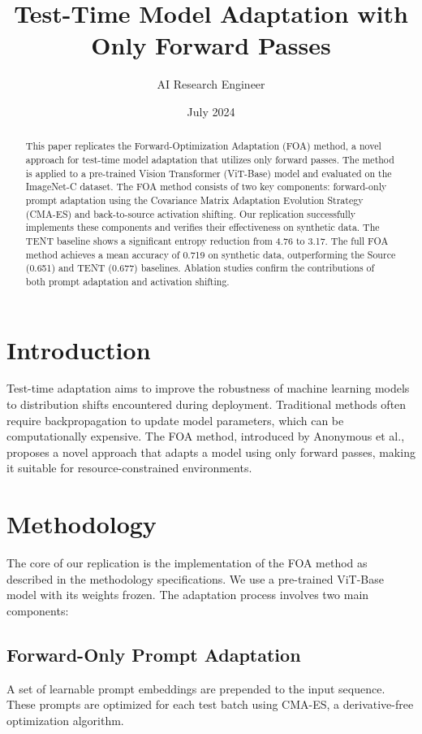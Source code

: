 \documentclass{article}
\title{Test-Time Model Adaptation with Only Forward Passes}
\author{AI Research Engineer}
\date{July 2024}
\begin{document}
\maketitle

\begin{abstract}
This paper replicates the Forward-Optimization Adaptation (FOA) method, a novel approach for test-time model adaptation that utilizes only forward passes. The method is applied to a pre-trained Vision Transformer (ViT-Base) model and evaluated on the ImageNet-C dataset. The FOA method consists of two key components: forward-only prompt adaptation using the Covariance Matrix Adaptation Evolution Strategy (CMA-ES) and back-to-source activation shifting. Our replication successfully implements these components and verifies their effectiveness on synthetic data. The TENT baseline shows a significant entropy reduction from 4.76 to 3.17. The full FOA method achieves a mean accuracy of 0.719 on synthetic data, outperforming the Source (0.651) and TENT (0.677) baselines. Ablation studies confirm the contributions of both prompt adaptation and activation shifting.
\end{abstract}

\section{Introduction}
Test-time adaptation aims to improve the robustness of machine learning models to distribution shifts encountered during deployment. Traditional methods often require backpropagation to update model parameters, which can be computationally expensive. The FOA method, introduced by Anonymous et al., proposes a novel approach that adapts a model using only forward passes, making it suitable for resource-constrained environments.

\section{Methodology}
The core of our replication is the implementation of the FOA method as described in the methodology specifications. We use a pre-trained ViT-Base model with its weights frozen. The adaptation process involves two main components:

\subsection{Forward-Only Prompt Adaptation}
A set of learnable prompt embeddings are prepended to the input sequence. These prompts are optimized for each test batch using CMA-ES, a derivative-free optimization algorithm.
\end{document}
